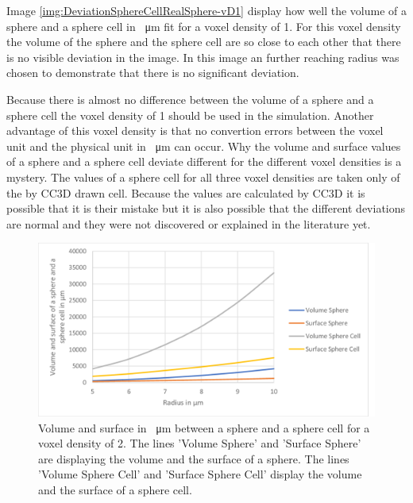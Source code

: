 Image \ref{img:DeviationSphereCellRealSphere-vD1} display how well the volume of a sphere and a sphere cell in \SI{}{\micro\metre} fit for a voxel density of 1. For this voxel density the volume of the sphere and the sphere cell are so close to each other that there is no visible deviation in the image. In this image an further reaching radius was chosen to demonstrate that there is no significant deviation.

Because there is almost no difference between the volume of a sphere and a sphere cell the voxel density of 1 should be used in the simulation. Another advantage of this voxel density is that no convertion errors between the voxel unit and the physical unit in \SI{}{\micro\metre} can occur. \newline
Why the volume and surface values of a sphere and a sphere cell deviate different for the different voxel densities is a mystery. The values of a sphere cell for all three voxel densities are taken only of the by \ac{CC3D} drawn cell. Because the values are calculated by \ac{CC3D} it is possible that it is their mistake but it is also possible that the different deviations are normal and they were not discovered or explained in the literature yet.
\begin{figure}[ht]
	\center
	\includegraphics[scale=0.3]{figures/DeviationSphereToPixelSphere-vD2.png}
	\caption[Volume and surface in \SI{}{\micro\metre} between a sphere and a sphere cell for a voxel density of 2]{Volume and surface in \SI{}{\micro\metre} between a sphere and a sphere cell for a voxel density of 2. The lines 'Volume Sphere' and 'Surface Sphere' are displaying the volume and the surface of a sphere. The lines 'Volume Sphere Cell' and 'Surface Sphere Cell' display the volume and the surface of a sphere cell.}
	\label{img:DeviationSphereCellRealSphere-vD2}
\end{figure}

